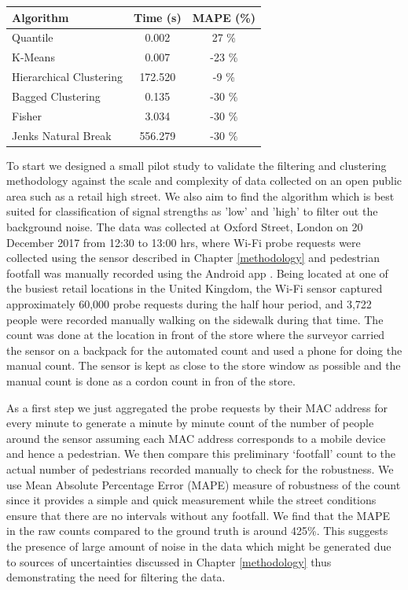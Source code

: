\begin{table}
{\begin{tabular}{lcc} 
	\toprule
	 Algorithm					& Time (s) 	& MAPE (\%) \\
	\midrule
	 Quantile					& 0.002 	&  27 \% \\
	 K-Means			 		& 0.007 	& -23 \% \\
	 Hierarchical Clustering	& 172.520 	&  -9 \% \\
	 Bagged Clustering 			& 0.135 	& -30 \% \\
	 Fisher 					& 3.034 	& -30 \% \\
	 Jenks Natural Break 		& 556.279 	& -30 \% \\
	 \bottomrule
\end{tabular}}
\label{classification-table}
\end{table}

To start we designed a small pilot study to validate the filtering and
clustering methodology against the scale and complexity of data collected on an
open public area such as a retail high street.  We also aim to find the
algorithm which is best suited for classification of signal strengths as 'low'
and 'high' to filter out the background noise.  The data was collected at Oxford
Street, London on 20 December 2017 from 12:30 to 13:00 hrs, where Wi-Fi probe
requests were collected using the sensor described in Chapter \ref{methodology}
and pedestrian footfall was manually recorded using the Android app
\citep{bala2018clicker}.  Being located at one of the busiest retail locations
in the United Kingdom, the Wi-Fi sensor captured approximately 60,000 probe
requests during the half hour period, and 3,722 people were recorded manually
walking on the sidewalk during that time. The count was done at the location in
front of the store where the surveyor carried the sensor on a backpack for the
automated count and used a phone for doing the manual count. The sensor is kept
as close to the store window as possible and the manual count is done as a
cordon count in fron of the store.

As a first step we just aggregated the probe requests by their MAC address for
every minute to generate a minute by minute count of the number of people around
the sensor assuming each MAC address corresponds to a mobile device and hence a
pedestrian.  We then compare this preliminary `footfall' count to the actual
number of pedestrians recorded manually to check for the robustness. We use Mean
Absolute Percentage Error (MAPE) measure of robustness of the count since it
provides a simple and quick measurement while the street conditions ensure that
there are no intervals without any footfall.  We find that the MAPE in the raw
counts compared to the ground truth is around 425\%.  This suggests the presence
of large amount of noise in the data which might be generated due to sources of
uncertainties discussed in Chapter \ref{methodology} thus demonstrating the need
for filtering the data.


